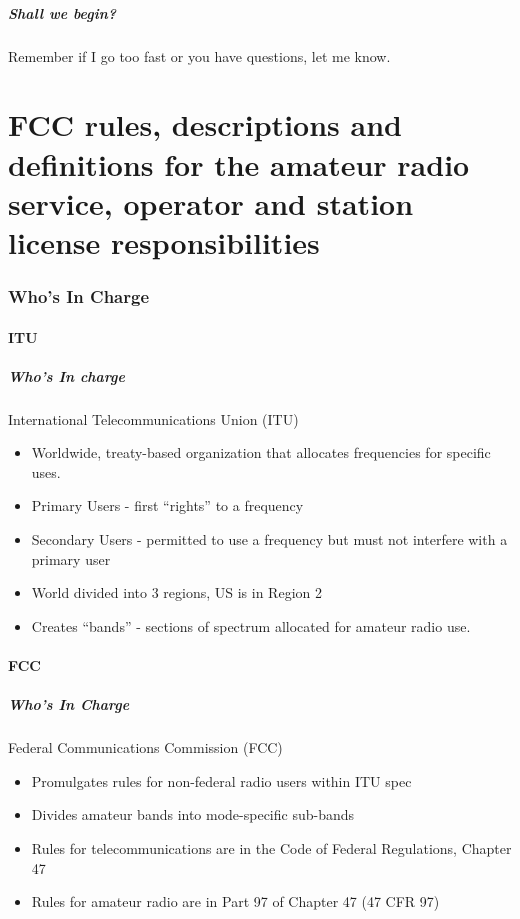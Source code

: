 \documentclass[10pt, handout]{beamer}
\begin{document}
\begin{frame}
\frametitle{Shall we begin?}
Remember if I go too fast or you have questions, let me know.
\end{frame}


\part{FCC rules, descriptions and definitions for the amateur radio service, operator and station license responsibilities}

\section{Who's In Charge}
\subsection{ITU}

\begin{frame}
\frametitle{Who's In charge}
International Telecommunications Union (ITU)
\begin{itemize}
\item Worldwide, treaty-based organization that allocates frequencies for specific uses.
\item Primary Users - first ``rights'' to a frequency
\item Secondary Users - permitted to use a frequency but must not interfere with a primary user
\item World divided into 3 regions, US is in Region 2
\item Creates ``bands'' - sections of spectrum allocated for amateur radio use.
\end{itemize}
\end{frame}

\subsection{FCC}

\begin{frame}
\frametitle{Who's In Charge}
Federal Communications Commission (FCC)
\begin{itemize}
\item Promulgates rules for non-federal radio users within ITU spec
\item Divides amateur bands into mode-specific sub-bands
\item Rules for telecommunications are in the Code of Federal Regulations, Chapter 47
\item Rules for amateur radio are in Part 97 of Chapter 47 (47 CFR 97)
\end{itemize}
\end{frame}
\end{document}
